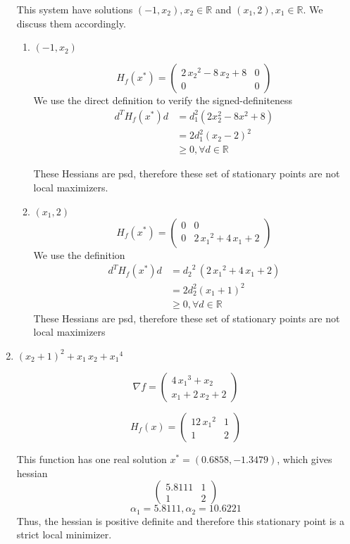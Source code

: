 \begin{enumerate}
This system have solutions $(-1, x_2), x_2\in \mathbb{R}$ and $(x_1, 2), x_1\in \mathbb{R}$. We discuss them accordingly.

\begin{enumerate}
\item $(-1, x_2)$\par
\[
H_f(x^*)=\left(\begin{array}{cc}
2\,{x_2 }^2 -8\,x_2 +8 & 0\\
0 & 0
\end{array}\right)
\]
We use the direct definition to verify the signed-definiteness
\begin{align*}
d^TH_f(x^*)d &= d_1^2 (2x_2^2-8x^2+8) \\
            &= 2 d_1^2(x_2 - 2)^2 \\
            & \geq 0, \forall d \in \mathbb{R}
\end{align*}

These Hessians are psd, therefore these set of stationary points are not local maximizers.

\item $(x_1, 2)$
\[
H_f(x^*)=\left(\begin{array}{cc}
0 & 0\\
0 & 2\,{x_1 }^2 +4\,x_1 +2
\end{array}\right)
\]
We use the definition
\begin{align*}
d^TH_f(x^*)d &= {d_2 }^2 \,{\left(2\,{x_1 }^2 +4\,x_1 +2\right)}\\
             &= 2d_2^2(x_1 + 1)^2\\
             &\geq 0, \forall d \in \mathbb{R}
\end{align*}
These Hessians are psd, therefore these set of stationary points are not local maximizers

\end{enumerate}

\item ${{\left(x_2 +1\right)}}^2 +x_1 \,x_2 +{x_1 }^4$\par
\[
\nabla f = \left(\begin{array}{c}
4\,{x_1 }^3 +x_2 \\
x_1 +2\,x_2 +2
\end{array}\right)
\]

\[
H_f(x)=\left(\begin{array}{cc}
12\,{x_1 }^2  & 1\\
1 & 2
\end{array}\right)
\]

This function has one real solution $x^*=(0.6858, -1.3479)$, which gives hessian
\[
\left(\begin{array}{cc}
5.8111 & 1\\
1 & 2
\end{array}\right)
\]
\[
\alpha_1 = 5.8111, \alpha_2 = 10.6221
\]
Thus, the hessian is positive definite and therefore this stationary point is a strict local minimizer.


\end{enumerate}
